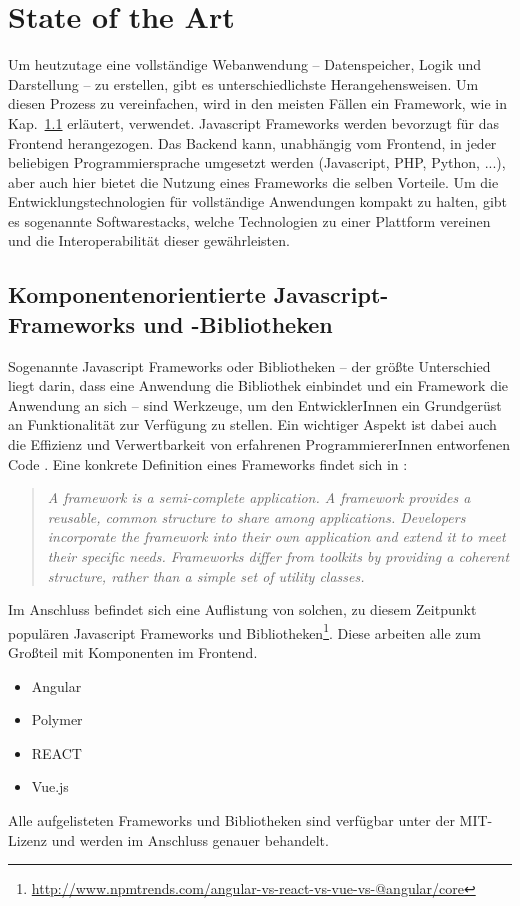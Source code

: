 \chapter{State of the Art}
\label{cha:StateOfTheArt}
Um heutzutage eine vollständige Webanwendung -- Datenspeicher, Logik und Darstellung -- zu erstellen, gibt es unterschiedlichste Herangehensweisen. Um diesen Prozess zu vereinfachen, wird in den meisten Fällen ein Framework, wie in Kap.~\ref{cha:javascript-frameworks} erläutert, verwendet. Javascript Frameworks werden bevorzugt für das Frontend herangezogen. Das Backend kann, unabhängig vom Frontend, in jeder beliebigen Programmiersprache umgesetzt werden (Javascript, PHP, Python, ...), aber auch hier bietet die Nutzung eines Frameworks die selben Vorteile. Um die Entwicklungstechnologien für vollständige Anwendungen kompakt zu halten, gibt es sogenannte Softwarestacks, welche Technologien zu einer Plattform vereinen und die Interoperabilität dieser gewährleisten.

\section{Komponentenorientierte Javascript-Frameworks und -Bibliotheken}
\label{cha:javascript-frameworks}
Sogenannte Javascript Frameworks oder Bibliotheken -- der größte Unterschied liegt darin, dass eine Anwendung die Bibliothek einbindet und ein Framework die Anwendung an sich -- sind Werkzeuge, um den EntwicklerInnen ein Grundgerüst an Funktionalität zur Verfügung zu stellen. Ein wichtiger Aspekt ist dabei auch die Effizienz und Verwertbarkeit von erfahrenen ProgrammiererInnen entworfenen Code \cite{js-frameworks}.
Eine konkrete Definition eines Frameworks findet sich in \cite{def-framework}: 
\begin{quote}\textit{A framework is a semi-complete application. A framework provides a reusable, common structure to share among applications. Developers incorporate the framework into their own application and extend it to meet their specific needs. Frameworks differ from toolkits by providing a coherent structure, rather than a simple set of utility classes.}
\end{quote}

Im Anschluss befindet sich eine Auflistung von solchen, zu diesem Zeitpunkt populären Javascript Frameworks und Bibliotheken\footnote{\url{http://www.npmtrends.com/angular-vs-react-vs-vue-vs-@angular/core}}. Diese arbeiten alle zum Großteil mit Komponenten im Frontend.
\begin{itemize}  
	\item Angular
	\item Polymer
	\item REACT
	\item Vue.js
\end{itemize}
Alle aufgelisteten Frameworks und Bibliotheken sind verfügbar unter der MIT-Lizenz und werden im Anschluss genauer behandelt.

